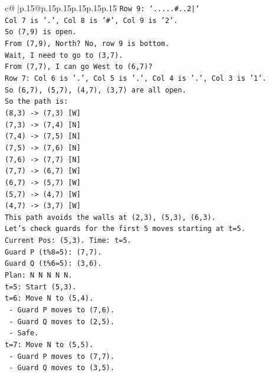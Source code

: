 \documentclass{article}
\begin{document}
{\begin{supertabular}{c@{$\;$}|p{.15\linewidth}@{}p{.15\linewidth}p{.15\linewidth}p{.15\linewidth}p{.15\linewidth}p{.15\linewidth}}
{{{\texttt{Row 9: `.....\#..2|`} \\
\texttt{Col 7 is '.', Col 8 is '\#', Col 9 is '2'.} \\
\texttt{So (7,9) is open.} \\
\texttt{From (7,9), North? No, row 9 is bottom.} \\
\texttt{Wait, I need to go to (3,7).} \\
\texttt{From (7,7), I can go West to (6,7)?} \\
\texttt{Row 7: Col 6 is '.', Col 5 is '.', Col 4 is '.', Col 3 is '1'.} \\
\texttt{So (6,7), (5,7), (4,7), (3,7) are all open.} \\
\texttt{So the path is:} \\
\texttt{(8,3) {-}> (7,3) {[}W{]}} \\
\texttt{(7,3) {-}> (7,4) {[}N{]}} \\
\texttt{(7,4) {-}> (7,5) {[}N{]}} \\
\texttt{(7,5) {-}> (7,6) {[}N{]}} \\
\texttt{(7,6) {-}> (7,7) {[}N{]}} \\
\texttt{(7,7) {-}> (6,7) {[}W{]}} \\
\texttt{(6,7) {-}> (5,7) {[}W{]}} \\
\texttt{(5,7) {-}> (4,7) {[}W{]}} \\
\texttt{(4,7) {-}> (3,7) {[}W{]}} \\
\texttt{This path avoids the walls at (2,3), (5,3), (6,3).} \\
\texttt{Let's check guards for the first 5 moves starting at t=5.} \\
\texttt{Current Pos: (5,3). Time: t=5.} \\
\texttt{Guard P (t\%8=5): (7,7).} \\
\texttt{Guard Q (t\%6=5): (3,6).} \\
\texttt{Plan: N N N N N.} \\
\texttt{t=5: Start (5,3).} \\
\texttt{t=6: Move N to (5,4).} \\
\texttt{  {-} Guard P moves to (7,6).} \\
\texttt{  {-} Guard Q moves to (2,5).} \\
\texttt{  {-} Safe.} \\
\texttt{t=7: Move N to (5,5).} \\
\texttt{  {-} Guard P moves to (7,7).} \\
\texttt{  {-} Guard Q moves to (3,5).} \\
}}}
\end{supertabular}}
\end{document}
